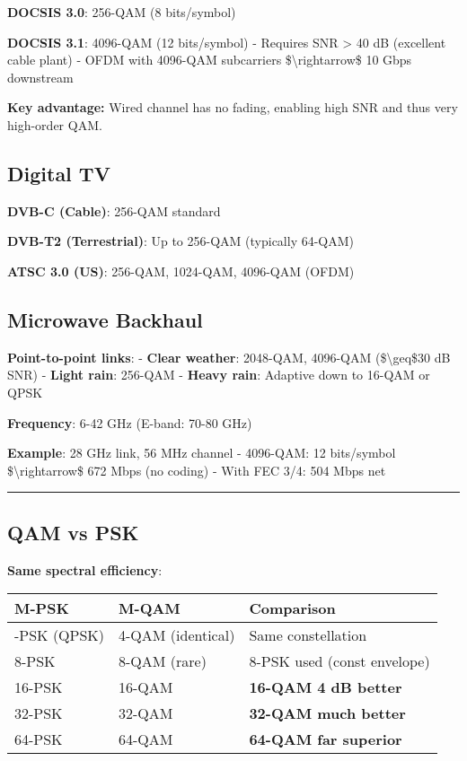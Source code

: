 \textbf{DOCSIS 3.0}: 256-QAM (8 bits/symbol)

\textbf{DOCSIS 3.1}: 4096-QAM (12 bits/symbol) - Requires SNR
\textgreater{} 40 dB (excellent cable plant) - OFDM with 4096-QAM
subcarriers \$\textbackslash rightarrow\$ 10 Gbps downstream

\textbf{Key advantage:} Wired channel has no fading, enabling high SNR and thus very high-order QAM.

\subsection{Digital TV}

\textbf{DVB-C (Cable)}: 256-QAM standard

\textbf{DVB-T2 (Terrestrial)}: Up to 256-QAM (typically 64-QAM)

\textbf{ATSC 3.0 (US)}: 256-QAM, 1024-QAM, 4096-QAM (OFDM)

\subsection{Microwave Backhaul}

\textbf{Point-to-point links}: - \textbf{Clear weather}: 2048-QAM,
4096-QAM (\$\textbackslash geq\$30 dB SNR) - \textbf{Light rain}:
256-QAM - \textbf{Heavy rain}: Adaptive down to 16-QAM or QPSK

\textbf{Frequency}: 6-42 GHz (E-band: 70-80 GHz)

\textbf{Example}: 28 GHz link, 56 MHz channel - 4096-QAM: 12 bits/symbol
\$\textbackslash rightarrow\$ 672 Mbps (no coding) - With FEC 3/4: 504
Mbps net

\begin{center}\rule{0.5\linewidth}{0.5pt}\end{center}

\subsection{QAM vs PSK}\label{qam-vs-psk}

\textbf{Same spectral efficiency}:

{\def\LTcaptype{} %
\begin{longtable}[]{@{}lll@{}}
\toprule\noalign{}
M-PSK & M-QAM & Comparison \\
\midrule\noalign{}
\endhead
\bottomrule\noalign{}
\endlastfoot
4-PSK (QPSK) & 4-QAM (identical) & Same constellation \\
8-PSK & 8-QAM (rare) & 8-PSK used (const envelope) \\
16-PSK & 16-QAM & \textbf{16-QAM 4 dB better} \\
32-PSK & 32-QAM & \textbf{32-QAM much better} \\
64-PSK & 64-QAM & \textbf{64-QAM far superior} \\
\end{longtable}
}

